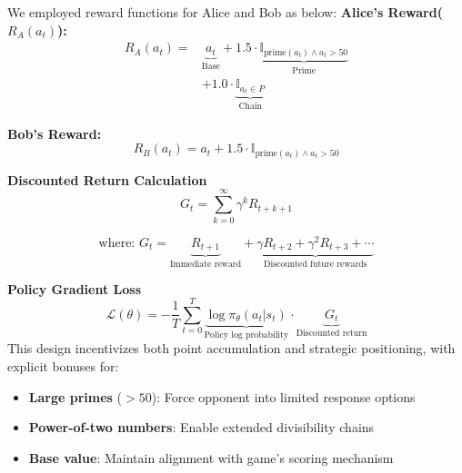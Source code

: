 \documentclass[twocolumn, a4paper]{article}
\begin{document}
We employed reward functions for Alice and Bob as below:
\textbf{Alice's Reward($R_A(a_t)$):}
\begin{equation}
\begin{aligned}
R_A(a_t) = &\underbrace{a_t}_{\text{Base}} + 1.5 \cdot \underbrace{\mathbb{I}_{\text{prime}(a_t) \land a_t > 50}}_{\text{Prime}} \\
&+ 1.0 \cdot \underbrace{\mathbb{I}_{a_t \in P}}_{\text{Chain}}
\end{aligned}
\end{equation}
 
\textbf{Bob's Reward:}
\begin{equation}
R_B(a_t) = a_t + 1.5 \cdot \mathbb{I}_{\text{prime}(a_t) \land a_t > 50}
\end{equation}

\textbf{Discounted Return Calculation}
\begin{equation}
G_t = \sum_{k=0}^{\infty} \gamma^k R_{t+k+1}
\end{equation}

\begin{equation}
\text{where: } G_t = \underbrace{R_{t+1}}_{\text{Immediate reward}} + \underbrace{\gamma R_{t+2} + \gamma^2 R_{t+3} + \cdots}_{\text{Discounted future rewards}}
\end{equation}

\textbf{Policy Gradient Loss}
\begin{equation}
\mathcal{L}(\theta) = -\frac{1}{T} \sum_{t=0}^{T} \underbrace{\log \pi_\theta(a_t | s_t)}_{\text{Policy log probability}} \cdot \underbrace{G_t}_{\text{Discounted return}}
\end{equation}
 This design incentivizes both point accumulation and strategic positioning, with explicit bonuses for:
\begin{itemize}
\item \textbf{Large primes} ($>50$): Force opponent into limited response options
\item \textbf{Power-of-two numbers}: Enable extended divisibility chains
\item \textbf{Base value}: Maintain alignment with game's scoring mechanism
\end{itemize}
\end{document}

